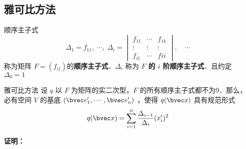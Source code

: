 \subsection{雅可比方法}
\begin{definition}{顺序主子式}
\begin{equation}
\Delta_1=f_{11},\;\cdots,\;\Delta_i=\begin{vmatrix}
f_{11}&\cdots&f_{1k}\\
\vdots&\vdots&\vdots\\
f_{i1}&\cdots&f{ii}
\end{vmatrix},\quad
\cdots
\end{equation}
称为矩阵 $F=(f_{ij})$的\textbf{顺序主子式}．$\Delta_i$ 称为\textbf{ $F$ 的 $i$ 阶顺序主子式}．且约定 $\Delta_0=1$
\end{definition}
\begin{theorem}{雅可比方法}
设 $q$ 以 $F$ 为矩阵的实二次型，$F$ 的所有顺序主子式都不为9．那么，必有空间 $V$ 的基底 $(\bvec e'_1,\cdots,\bvec e'_n)$ ，使得 $q(\bvec x)$ 具有规范形式
\begin{equation}\label{DeQua_eq4}
q(\bvec x)=\sum_{i=1}^n\frac{\Delta_{i-1}}{\Delta_i}(x'_i)^2
\end{equation}
\end{theorem}
\textbf{证明：}

